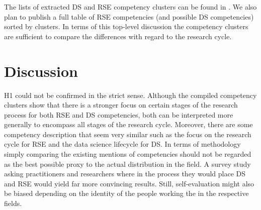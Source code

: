 \documentclass[
        english,biblatex
    ]{lni}
\begin{document}
    The lists of extracted DS and RSE competency clusters can be found
    in \autocite{ds2rse2025}. We also plan to publish a full table of
    RSE competencies (and possible DS competencies) sorted by clusters.
    In terms of this top-level discussion the competency clusters are
    sufficient to compare the differences with regard to the research
    cycle.

    \section{Discussion}\label{discussion}

    H1 could not be confirmed in the strict sense. Although the compiled
    competency clusters show that there is a stronger focus on certain
    stages of the research process for both RSE and DS competencies,
    both can be interpreted more generally to encompass all stages of
    the research cycle. Moreover, there are some competency description
    that seem very similar such as the focus on the research cycle for
    RSE and the data science lifecycle for DS. In terms of methodology
    simply comparing the existing mentions of competencies should not be
    regarded as the best possible proxy to the actual distribution in
    the field. A survey study asking practitioners and researchers where
    in the process they would place DS and RSE would yield far more
    convincing results. Still, self-evaluation might also be biased
    depending on the identity of the people working the in the
    respective fields.
\end{document}
